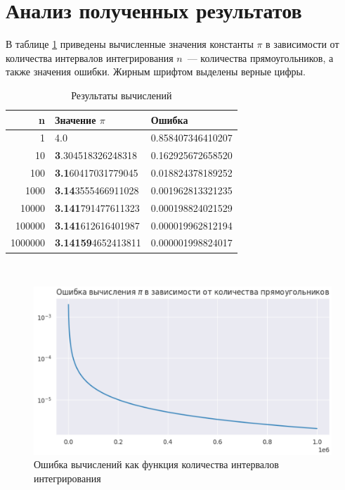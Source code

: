 \documentclass[a4paper,12pt]{article}
\begin{document}
\section{Анализ полученных результатов}

В таблице \ref{table:results} приведены вычисленные значения константы $\pi$ в зависимости от количества интервалов интегрирования $n$~--- количества прямоугольников, а также значения ошибки. Жирным шрифтом выделены верные цифры.

\begin{table}[h!]
    \caption{Результаты вычислений\label{table:results}}
    \begin{center}
    \begin{tabular}{||r l l||} 
     \hline
     n & Значение $\pi$ & Ошибка \\ [0.5ex] 
     \hline\hline
     1       & 4.0                        & 0.858407346410207 \\ 
     \hline
     10      & \textbf{3}.304518326248318 & 0.162925672658520 \\
     \hline
     100     & \textbf{3.1}60417031779045 & 0.018824378189252 \\
     \hline
     1000    & \textbf{3.14}3555466911028 & 0.001962813321235 \\ 
     \hline
     10000   & \textbf{3.141}791477611323 & 0.000198824021529 \\ 
     \hline
     100000  & \textbf{3.141}612616401987 & 0.000019962812194 \\ 
     \hline
     1000000 & \textbf{3.14159}4652413811 & 0.000001998824017 \\ 
     \hline               
    \end{tabular}
    \end{center}
\end{table}


\begin{figure}[h]\
    \begin{center}
    \includegraphics[width=15cm]{error.png}    
    \caption{Ошибка вычислений как функция количества интервалов интегрирования}
    \label{fig:error}
    \end{center}
\end{figure}
\end{document}

